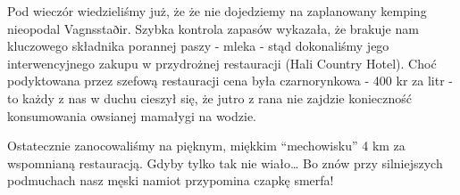 Pod wieczór wiedzieliśmy już, że że nie dojedziemy na zaplanowany kemping nieopodal Vagnsstaðir. Szybka kontrola zapasów wykazała, że brakuje nam kluczowego składnika porannej paszy - mleka - stąd dokonaliśmy jego interwencyjnego zakupu w przydrożnej restauracji (Hali Country Hotel). Choć podyktowana przez szefową restauracji cena była czarnorynkowa - 400 kr za litr - to każdy z nas w duchu cieszył się, że jutro z rana nie zajdzie konieczność konsumowania owsianej mamałygi na wodzie.

Ostatecznie zanocowaliśmy na pięknym, miękkim “mechowisku” 4 km za wspomnianą restauracją. Gdyby tylko tak nie wiało… Bo znów przy silniejszych podmuchach nasz męski namiot przypomina czapkę smerfa!